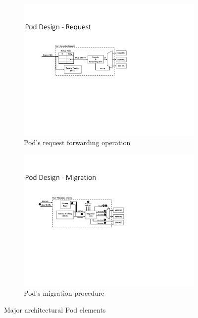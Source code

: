 \begin{figure}
\begin{subfigure}{0.46\textwidth}
  \centering
  \includegraphics[width=\textwidth]{figures/pod_design_request.pdf}
  \caption{Pod's request forwarding operation}
\end{subfigure}%

\begin{subfigure}{0.46\textwidth}
  \centering
  \includegraphics[width=\textwidth]{figures/pod_design_migration.pdf}
  \caption{Pod's migration procedure}
\end{subfigure}
\caption{Major architectural Pod elements}
\label{fig:architecture_pod}
\end{figure}

